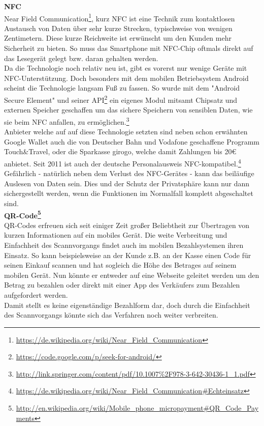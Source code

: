 \textbf{NFC}\\
Near Field Communication\footnote{\url{https://de.wikipedia.org/wiki/Near_Field_Communication}}, kurz NFC ist eine Technik zum kontaktlosen Austausch von Daten über sehr kurze Strecken, typischweise von wenigen Zentimetern. Diese kurze Reichweite ist erwünscht um den Kunden mehr Sicherheit zu bieten. So muss das Smartphone mit NFC-Chip oftmals direkt auf das Lesegerät gelegt bzw. daran gehalten werden. \\
Da die Technologie noch relativ neu ist, gibt es vorerst nur wenige Geräte mit NFC-Unterstützung. Doch besonders mit dem mobilen Betriebsystem Android scheint die Technologie langsam Fuß zu fassen. So wurde mit dem "Android Secure Element" und seiner API\footnote{\url{https://code.google.com/p/seek-for-android/}} ein eigenes Modul mitsamt Chipsatz und externen Speicher geschaffen um das sichere Speichern von sensiblen Daten, wie sie beim NFC anfallen, zu ermöglichen.\footnote{\url{http://link.springer.com/content/pdf/10.1007\%2F978-3-642-30436-1_1.pdf}}\\
Anbieter welche auf auf diese Technologie setzten sind neben schon erwähnten Google Wallet auch die von Deutscher Bahn und Vodafone geschaffene Programm Touch\&Travel, oder die Sparkasse girogo, welche damit Zahlungen bis 20€ anbietet.
Seit 2011 ist auch der deutsche Personalausweis NFC-kompatibel.\footnote{\url{https://de.wikipedia.org/wiki/Near_Field_Communication\#Echteinsatz}}\\
Gefährlich - natürlich neben dem Verlust des NFC-Gerätes - kann das beiläufige Auslesen von Daten sein. Dies und der Schutz der Privatsphäre kann nur dann sichergestellt werden, wenn die Funktionen im Normalfall komplett abgeschaltet sind.\\

\textbf{QR-Code\footnote{\url{http://en.wikipedia.org/wiki/Mobile_phone_micropayment\#QR_Code_Payments}}}\\
QR-Codes erfreuen sich seit einiger Zeit großer Beliebtheit zur Übertragen von kurzen Informationen auf ein mobiles Gerät. Die weite Verbreitung und Einfachheit des Scannvorgangs findet auch im mobilen Bezahlsystemen ihren Einsatz. So kann beispielsweise an der Kunde z.B. an der Kasse einen Code für seinen Einkauf scannen und hat sogleich die Höhe des Betrages auf seinem mobilen Gerät. Nun könnte er entweder auf eine Webseite geleitet werden um den Betrag zu bezahlen oder direkt mit einer App des Verkäufers zum Bezahlen aufgefordert werden.\\
Damit stellt es keine eigenständige Bezahlform dar, doch durch die Einfachheit des Scannvorgangs könnte sich das Verfahren noch weiter verbreiten. 
